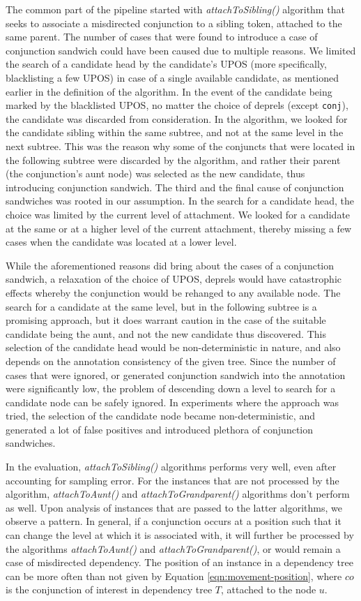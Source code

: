 The common part of the pipeline started with \textit{attachToSibling()} algorithm that seeks to associate a misdirected conjunction to a sibling token, attached to the same parent. The number of cases that were found to introduce a case of conjunction sandwich could have been caused due to multiple reasons. We limited the search of a candidate head by the candidate's UPOS (more specifically, blacklisting a few UPOS) in case of a single available candidate, as mentioned earlier in the definition of the algorithm. In the event of the candidate being marked by the blacklisted UPOS, no matter the choice of deprels (except \verb|conj|), the candidate was discarded from consideration. In the algorithm, we looked for the candidate sibling within the same subtree, and not at the same level in the next subtree. This was the reason why some of the conjuncts that were located in the following subtree were discarded by the algorithm, and rather their parent (the conjunction's aunt node) was selected as the new candidate, thus introducing conjunction sandwich. The third and the final cause of conjunction sandwiches was rooted in our assumption. In the search for a candidate head, the choice was limited by the current level of attachment. We looked for a candidate at the same or at a higher level of the current attachment, thereby missing a few cases when the candidate was located at a lower level.

While the aforementioned reasons did bring about the cases of a conjunction sandwich, a relaxation of the choice of UPOS, deprels would have catastrophic effects whereby the conjunction would be rehanged to any available node. The search for a candidate at the same level, but in the following subtree is a promising approach, but it does warrant caution in the case of the suitable candidate being the aunt, and not the new candidate thus discovered. This selection of the candidate head would be non-deterministic in nature, and also depends on the annotation consistency of the given tree. Since the number of cases that were ignored, or generated conjunction sandwich into the annotation were significantly low, the problem of descending down a level to search for a candidate node can be safely ignored. In experiments where the approach was tried, the selection of the candidate node became non-deterministic, and generated a lot of false positives and introduced plethora of conjunction sandwiches.

In the evaluation, \textit{attachToSibling()} algorithms performs very well, even after accounting for sampling error. For the instances that are not processed by the algorithm, \textit{attachToAunt()} and \textit{attachToGrandparent()} algorithms don't perform as well. Upon analysis of instances that are passed to the latter algorithms, we observe a pattern. In general, if a conjunction occurs at a position such that it can change the level at which it is associated with, it will further be processed by the algorithms \textit{attachToAunt()} and \textit{attachToGrandparent()}, or would remain a case of misdirected dependency. The position of an instance in a dependency tree can be more often than not given by Equation \ref{eqn:movement-position}, where \(co\) is the conjunction of interest in dependency tree \(T\), attached to the node \(u\).

